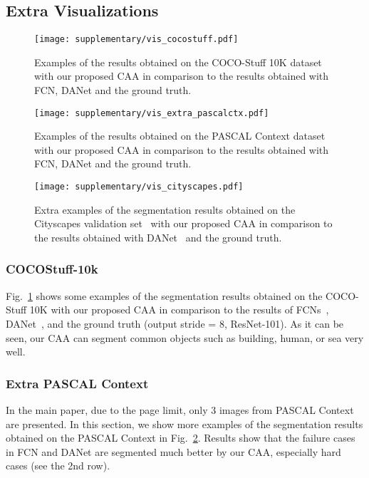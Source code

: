 \documentclass[letterpaper]{article} \usepackage{aaai22}  \usepackage{times}  \usepackage{helvet}  \usepackage{courier}  \usepackage[hyphens]{url}  \usepackage{graphicx} \urlstyle{rm} \def\UrlFont{\rm}  \usepackage{natbib}  \usepackage{caption} \DeclareCaptionStyle{ruled}{labelfont=normalfont,labelsep=colon,strut=off} \frenchspacing  \setlength{\pdfpagewidth}{8.5in}  \setlength{\pdfpageheight}{11in}  \usepackage{algorithm}
\begin{document}
\subsection{Extra Visualizations}

\begin{figure}[t]
	\centering
	\texttt{[image: supplementary/vis\_cocostuff.pdf]}
	\caption{Examples of the results obtained on the COCO-Stuff 10K dataset with our proposed CAA in comparison to the results obtained with FCN, DANet and the ground truth.} \label{fviscocostuff}
\end{figure}

\begin{figure}[t]
    \centering
    \texttt{[image: supplementary/vis\_extra\_pascalctx.pdf]}
    \caption{Examples of the results obtained on the PASCAL Context dataset with our proposed CAA in comparison to the results obtained with FCN, DANet and the ground truth.}
    \label{fig:extrapascalctx}
\end{figure}

\begin{figure*}[t]
    \centering
    \texttt{[image: supplementary/vis\_cityscapes.pdf]}
    \caption{Extra examples of the segmentation results obtained on the Cityscapes validation set~\cite{cCityScapes} with our proposed CAA in comparison to the results obtained with DANet~\cite{cDualAttention} and the ground truth.}
    \label{fig:viscityscapes}
\end{figure*}

\subsubsection{COCOStuff-10k}

Fig.~\ref{fviscocostuff} shows some examples of the segmentation results obtained on the COCO-Stuff 10K with our proposed CAA in comparison to the results of FCNs~\cite{cFCN}, DANet~\cite{cDualAttention}, and the ground truth (output stride = 8, ResNet-101). 
As it can be seen, our CAA can segment common objects such as building, human, or sea very well. 

\subsubsection{Extra PASCAL Context} In the main paper, due to the page limit, only 3 images from PASCAL Context are presented. 
In this section, we show more examples of the segmentation results obtained on the PASCAL Context in Fig.~\ref{fig:extrapascalctx}. Results show that the failure cases in FCN and DANet are segmented much better by our CAA, especially hard cases (see the 2nd row).
\end{document}
